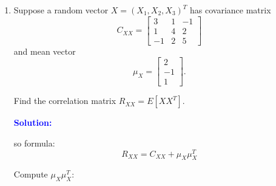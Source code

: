 \documentclass[11pt]{article}
\newcommand{\solution}{
    \vspace{0.3cm}
    \noindent\textbf{\textcolor{blue}{Solution:}}
    \vspace{0.3cm}
}
\begin{document}
\begin{enumerate}[label=\textbf{Question-\arabic*:}, leftmargin=*]
\[\[Find the covariance matrix $C_{XX}$.

\solution

formula:
\[
C_{XX} = R_{XX} - \mu_X\mu_X^T
\]

so $\mu_X\mu_X^T$:

\[
\mu_X\mu_X^T =
\begin{bmatrix}1\\2\\-1\end{bmatrix}
\begin{bmatrix}1&2&-1\end{bmatrix}
=
\begin{bmatrix}1&2&-1\\2&4&-2\\-1&-2&1\end{bmatrix}
\]

Subtract:

\[
C_{XX} =
\begin{bmatrix}5&3&-1\\3&10&-2\\-1&-2&6\end{bmatrix}
-
\begin{bmatrix}1&2&-1\\2&4&-2\\-1&-2&1\end{bmatrix}
=
\begin{bmatrix}4&1&0\\1&6&0\\0&0&5\end{bmatrix}
\]

\newpage

\item Suppose a random vector $X = (X_1, X_2, X_3)^T$ has covariance matrix
\[
C_{XX} =
\begin{bmatrix}3&1&-1\\1&4&2\\-1&2&5\end{bmatrix}
\]
and mean vector
\[
\mu_X =
\begin{bmatrix}2\\-1\\1\end{bmatrix}.
\]

Find the correlation matrix $R_{XX} = E[XX^T]$.

\solution

so formula:
\[
R_{XX} = C_{XX} + \mu_X\mu_X^T
\]

Compute $\mu_X\mu_X^T$:

\]\]
\end{enumerate}
\end{document}
